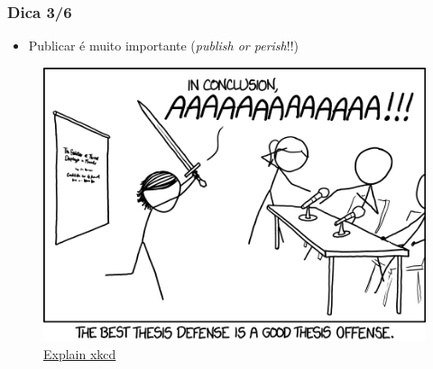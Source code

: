 \begin{frame}
    \frametitle{Dica 3/6}
        \begin{itemize}
            \item Publicar é muito importante (\textit{publish or perish}!!)
        \end{itemize}
        \begin{figure}
            \centering
            \includegraphics[width=0.8\linewidth]{figs/thesis_defense.png}
            \caption{\href{https://www.explainxkcd.com/wiki/index.php/1403:_Thesis_Defense}{Explain xkcd}}
        \end{figure}
\end{frame}

